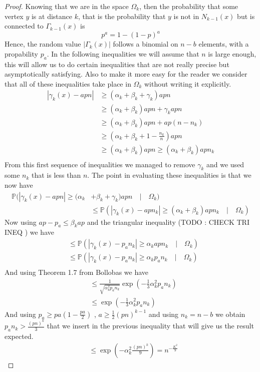 \begin{proof}
	Knowing that we are in the space $\Omega_k$, then the probability that some vertex $y$ is at distance $k$, that is the probability that $y$ is not in $N_{k-1}(x)$ but is connected to $\Gamma_{k-1}(x)$ is 
	\begin{equation}
		p^a = 1 - (1-p)^a
	\end{equation}
	Hence, the random value $|\Gamma_k(x)|$ follows a binomial on $n-b$ elements, with a propability $p_a$.
	In the following inequalities we will assume that $n$ is large enough, this will allow us to do certain inequalities that are not really precise but asymptotically satisfying. Also to make it more easy for the reader we consider that all of these inequalities take place in $\Omega_k$ without writing it explicitly.
	\begin{align}
		|\gamma_k(x) - apn| &\geq (\alpha_k + \beta_k + \gamma_k)apn \\
		 &\geq (\alpha_k + \beta_k)apn + \gamma_k apn \\
		 &\geq (\alpha_k + \beta_k)apn + ap(n-n_k) \\ 
		 &\geq (\alpha_k + \beta_k + 1 - \frac{n_k}{n})apn \\ 
		 &\geq (\alpha_k + \beta_k)apn \geq (\alpha_k + \beta_k)apn_k\\ 
	\end{align}
	From this first sequence of inequalities we managed to remove $\gamma_k$ and we used some $n_k$ that is less than $n$.
	The point in evaluating these inequalities is that we now have
	\begin{align}
		\mathbb{P}(|\gamma_k(x) - apn| \geq (\alpha_k &+ \beta_k + \gamma_k)apn \quad|\quad \Omega_k) \\&\leq \mathbb{P}(|\gamma_k(x) - apn_k| \geq (\alpha_k + \beta_k )apn_k \quad|\quad \Omega_k)
	\end{align}
	Now using $ap -p_a \leq \beta_k ap$ and the triangular inequality (TODO : CHECK TRI INEQ ) we have
	\begin{align}
		&\leq \mathbb{P}(|\gamma_k(x) - p_an_k| \geq \alpha_k apn_k \quad|\quad \Omega_k)\\
		&\leq \mathbb{P}(|\gamma_k(x) - p_an_k| \geq \alpha_k p_an_k \quad|\quad \Omega_k)\\
	\end{align}
	And using Theorem 1.7 from Bollobas we have
	\begin{align}
		&\leq \frac{1}{\sqrt{\alpha_k^2p_an_k}}\exp(-\frac{1}{3}\alpha_k^2p_an_k) \\
		&\leq \exp(-\frac{1}{3}\alpha_k^2p_an_k)
	\end{align}
	And using $p_a \geq pa(1-\frac{pa}{2})$ , $a \geq \frac{1}{2}(pn)^{k-1}$ and using $n_k = n-b$ we obtain $p_an_k > \frac{(pn)^k}{3}$ that we insert in the previous inequality that will give us the result expected.
	\begin{align}
		&\leq \exp(-\alpha_k^2\frac{(pn)^k}{9}) = n^{-\frac{K^2}{9}}
	\end{align}
\end{proof}
